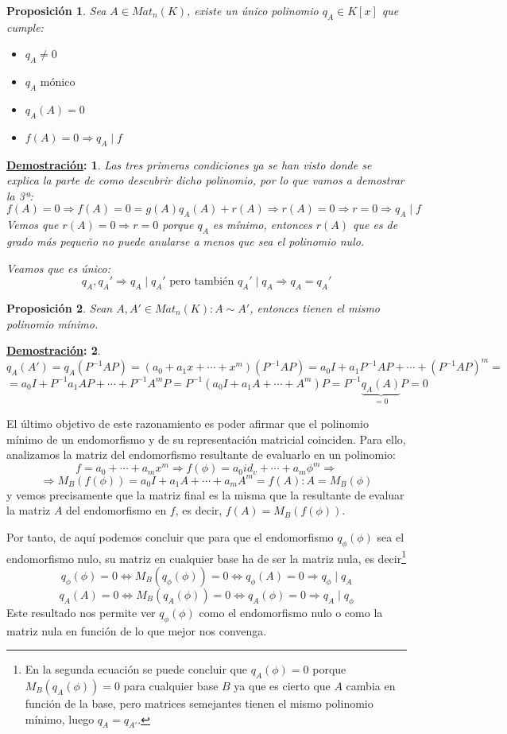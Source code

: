 \documentclass[10pt,a4paper,openright]{book}
\theoremstyle{break}
\newtheorem*{prop}{Proposición}
\newtheorem*{demo}{\underline{Demostración}:}
\begin{document}
\begin{prop}
Sea $A\in Mat_n(K)$, existe un único polinomio $q_A\in K[x]$ que cumple:
\begin{itemize}
\item $q_A\neq 0$
\item $q_A \mbox{ mónico }$
\item $q_A(A)=0$
\item $f(A)=0\Rightarrow q_A\mid f$
\end{itemize}
\end{prop}
\begin{demo}
Las tres primeras condiciones ya se han visto donde se explica la parte de como descubrir dicho polinomio, por lo que vamos a demostrar la 3ª:
$$f(A) = 0 \Rightarrow f(A)=0= g(A)q_A(A)+r(A)\Rightarrow r(A)=0\Rightarrow r=0\Rightarrow q_A\mid f$$
Vemos que $r(A)=0\Rightarrow r=0$ porque $q_A$ es mínimo, entonces $r(A)$ que es de grado más pequeño no puede anularse a menos que sea el polinomio nulo.

Veamos que es único:
$$q_A, q_A'\Rightarrow q_A\mid q_A' \mbox{ pero también }q_A'\mid q_A \Rightarrow q_A = q_A'$$
\end{demo}

\begin{prop}
Sean $A, A'\in Mat_n(K): A\sim A'$, entonces tienen el mismo polinomio mínimo.
\end{prop}
\begin{demo}
$$q_A(A')=q_A(P^{-1}AP)= (a_0+a_1x+\cdots+x^m)(P^{-1}AP)= a_0I+a_1P^{-1}AP+\cdots+(P^{-1}AP)^m= $$
$$= a_0I+P^{-1}a_1AP+\cdots+ P^{-1}A^mP= P^{-1}(a_0I+a_1A+\cdots+A^m)P = P^{-1}\underbrace{q_A(A)}_{=0}P = 0$$
\end{demo}

El último objetivo de este razonamiento es poder afirmar que el polinomio mínimo de un endomorfismo y de su representación matricial coinciden. Para ello, analizamos la matriz del endomorfismo resultante de evaluarlo en un polinomio:
$$f= a_0+\cdots+a_mx^m \Rightarrow f(\phi)= a_0 id_v+\cdots+a_m\phi^m\Rightarrow$$
$$\Rightarrow M_B(f(\phi))=a_0I+a_1A+\cdots+a_mA^m= f(A):A=M_B(\phi)$$
y vemos precisamente que la matriz final es la misma que la resultante de evaluar la matriz $A$ del endomorfismo en $f$, es decir, $f(A) = M_B(f(\phi))$.

Por tanto, de aquí podemos concluir que para que el endomorfismo $q_\phi(\phi)$ sea el endomorfismo nulo, su matriz en cualquier base ha de ser la matriz nula, es decir\footnote{En la segunda ecuación se puede concluir que $q_A(\phi) = 0$ porque $M_B(q_A(\phi)) = 0$ para cualquier base $B$ ya que es cierto que $A$ cambia en función de la base, pero matrices semejantes tienen el mismo polinomio mínimo, luego $q_A = q_{A'}$.}
$$q_\phi (\phi)=0\Leftrightarrow M_B(q_\phi(\phi))= 0\Leftrightarrow q_\phi(A)=0 \Rightarrow q_\phi \mid q_A$$
$$q_A(A) = 0 \Leftrightarrow M_B(q_A(\phi)) = 0 \Leftrightarrow q_A(\phi) = 0\Rightarrow q_A\mid q_\phi$$
Este resultado nos permite ver $q_\phi(\phi)$ como el endomorfismo nulo o como la matriz nula en función de lo que mejor nos convenga.
\end{document}
